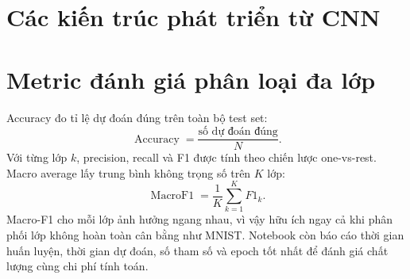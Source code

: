 \documentclass[12pt,a4paper]{report}
\begin{document}
\section{Các kiến trúc phát triển từ CNN}
\begin{table}[H]
\centering
\caption{Một số hướng phát triển tiêu biểu từ CNN cơ bản}
\label{tab:cnn_evolution}
\end{table}

\section{Metric đánh giá phân loại đa lớp}
Accuracy đo tỉ lệ dự đoán đúng trên toàn bộ test set:
\begin{equation}
    \operatorname{Accuracy}=\frac{\text{số dự đoán đúng}}{N}.
\end{equation}
Với từng lớp $k$, precision, recall và F1 được tính theo chiến lược one-vs-rest.
Macro average lấy trung bình không trọng số trên $K$ lớp:
\begin{equation}
    \operatorname{MacroF1}=\frac{1}{K}\sum_{k=1}^{K}F1_k.
\end{equation}
Macro-F1 cho mỗi lớp ảnh hưởng ngang nhau, vì vậy hữu ích ngay cả khi phân phối lớp không hoàn toàn cân bằng như MNIST.
Notebook còn báo cáo thời gian huấn luyện, thời gian dự đoán, số tham số và epoch tốt nhất để đánh giá chất lượng cùng chi phí tính toán.
\end{document}
